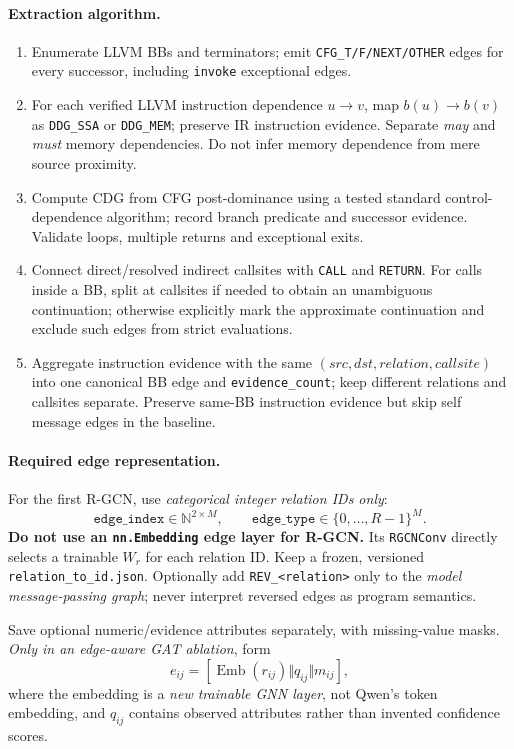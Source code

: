 \documentclass[10pt,a4paper]{article}
\begin{document}
\paragraph{Extraction algorithm.}
\begin{enumerate}
\item Enumerate LLVM BBs and terminators; emit \texttt{CFG\_T/F/NEXT/OTHER} edges for every successor, including \texttt{invoke} exceptional edges.
\item For each verified LLVM instruction dependence $u\to v$, map $b(u)\to b(v)$ as \texttt{DDG\_SSA} or \texttt{DDG\_MEM}; preserve IR instruction evidence. Separate \emph{may} and \emph{must} memory dependencies. Do not infer memory dependence from mere source proximity.
\item Compute CDG from CFG post-dominance using a tested standard control-dependence algorithm; record branch predicate and successor evidence. Validate loops, multiple returns and exceptional exits.
\item Connect direct/resolved indirect callsites with \texttt{CALL} and \texttt{RETURN}. For calls inside a BB, split at callsites if needed to obtain an unambiguous continuation; otherwise explicitly mark the approximate continuation and exclude such edges from strict evaluations.
\item Aggregate instruction evidence with the same $(src,dst,relation,callsite)$ into one canonical BB edge and \texttt{evidence\_count}; keep different relations and callsites separate. Preserve same-BB instruction evidence but skip self message edges in the baseline.
\end{enumerate}

\paragraph{Required edge representation.}
For the first R-GCN, use \emph{categorical integer relation IDs only}:
\[
 \texttt{edge\_index}\in\mathbb N^{2\times M},\qquad
 \texttt{edge\_type}\in\{0,\ldots,R-1\}^{M}.
\]
\textbf{Do not use an \texttt{nn.Embedding} edge layer for R-GCN.} Its \texttt{RGCNConv} directly selects a trainable $W_r$ for each relation ID. Keep a frozen, versioned \texttt{relation\_to\_id.json}. Optionally add \texttt{REV\_<relation>} only to the \emph{model message-passing graph}; never interpret reversed edges as program semantics.

Save optional numeric/evidence attributes separately, with missing-value masks. \emph{Only in an edge-aware GAT ablation}, form
\[
 e_{ij}=[\operatorname{Emb}(r_{ij})\Vert q_{ij}\Vert m_{ij}],
\]
where the embedding is a \emph{new trainable GNN layer}, not Qwen's token embedding, and $q_{ij}$ contains observed attributes rather than invented confidence scores.
\end{document}
